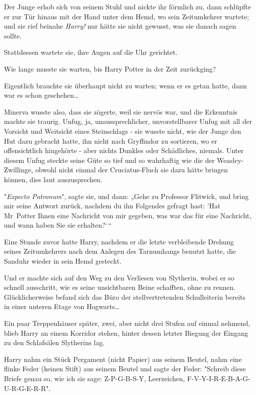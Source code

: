 {Der Junge erhob sich von seinem Stuhl und nickte ihr förmlich zu, dann schlüpfte er zur Tür hinaus mit der Hand unter dem Hemd, wo sein Zeitumkehrer wartete; und sie rief beinahe \emph{Harry!} nur hätte sie nicht gewusst, was sie danach sagen sollte.

Stattdessen wartete sie, ihre Augen auf die Uhr gerichtet.

Wie lange musste sie warten, bis Harry Potter in der Zeit zurückging?

Eigentlich brauchte sie überhaupt nicht zu warten; wenn er es getan hatte, dann war es schon geschehen…

Minerva wusste also, dass sie zögerte, weil sie nervös war, und die Erkenntnis machte sie traurig. Unfug, ja, unaussprechlicher, unvorstellbarer Unfug mit all der Vorsicht und Weitsicht eines Steinschlags - sie wusste nicht, wie der Junge den Hut dazu gebracht hatte, ihn nicht nach Gryffindor zu sortieren, wo er offensichtlich hingehörte - aber nichts Dunkles oder Schädliches, niemals. Unter diesem Unfug steckte seine Güte so tief und so wahrhaftig wie die der Weasley-Zwillinge, obwohl nicht einmal der Cruciatus-Fluch sie dazu hätte bringen können, dies laut auszusprechen.

"\emph{Expecto Patronum}", sagte sie, und dann: „Gehe zu Professor Flitwick, und bring mir seine Antwort zurück, nachdem du ihn Folgendes gefragt hast: 'Hat Mr~Potter Ihnen eine Nachricht von mir gegeben, was war das für eine Nachricht, und wann haben Sie sie erhalten?`\,“

Eine Stunde zuvor hatte Harry, nachdem er die letzte verbleibende Drehung seines Zeitumkehrers nach dem Anlegen des Tarnumhangs benutzt hatte, die Sanduhr wieder in sein Hemd gesteckt.

Und er machte sich auf den Weg zu den Verliesen von Slytherin, wobei er so schnell ausschritt, wie es seine unsichtbaren Beine schafften, ohne zu rennen. Glücklicherweise befand sich das Büro der stellvertretenden Schulleiterin bereits in einer unteren Etage von Hogwarts…

Ein paar Treppenhäuser später, zwei, aber nicht drei Stufen auf einmal nehmend, blieb Harry an einem Korridor stehen, hinter dessen letzter Biegung der Eingang zu den Schlafsälen Slytherins lag.

Harry nahm ein Stück Pergament (nicht Papier) aus seinem Beutel, nahm eine flinke Feder (keinen Stift) aus seinem Beutel und sagte der Feder: "Schreib diese Briefe genau so, wie ich sie sage: Z-P-G-B-S-Y, Leerzeichen, F-V-Y-I-R-E-B-A-G-U-R-G-E-R-R".

}

